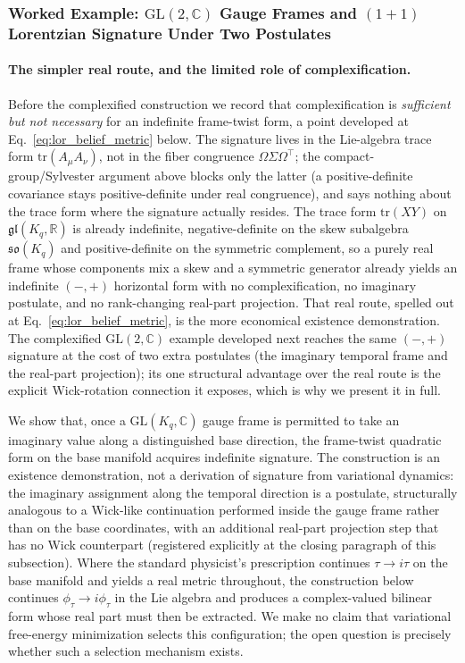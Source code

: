 \documentclass[11pt]{article}
\begin{document}
\subsubsection{Worked Example: $\mathrm{GL}(2, \mathbb{C})$ Gauge Frames and $(1{+}1)$ Lorentzian Signature Under Two Postulates}
\label{sec:worked_signature}

\paragraph{The simpler real route, and the limited role of complexification.} Before the complexified construction we record that complexification is \emph{sufficient but not necessary} for an indefinite frame-twist form, a point developed at Eq.~\eqref{eq:lor_belief_metric} below. The signature lives in the Lie-algebra trace form $\mathrm{tr}(A_\mu A_\nu)$, not in the fiber congruence $\Omega\Sigma\Omega^\top$; the compact-group/Sylvester argument above blocks only the latter (a positive-definite covariance stays positive-definite under real congruence), and says nothing about the trace form where the signature actually resides. The trace form $\mathrm{tr}(XY)$ on $\mathfrak{gl}(K_q, \mathbb{R})$ is already indefinite, negative-definite on the skew subalgebra $\mathfrak{so}(K_q)$ and positive-definite on the symmetric complement, so a purely real frame whose components mix a skew and a symmetric generator already yields an indefinite $(-,+)$ horizontal form with no complexification, no imaginary postulate, and no rank-changing real-part projection. That real route, spelled out at Eq.~\eqref{eq:lor_belief_metric}, is the more economical existence demonstration. The complexified $\mathrm{GL}(2,\mathbb{C})$ example developed next reaches the same $(-,+)$ signature at the cost of two extra postulates (the imaginary temporal frame and the real-part projection); its one structural advantage over the real route is the explicit Wick-rotation connection it exposes, which is why we present it in full.

We show that, once a $\mathrm{GL}(K_q, \mathbb{C})$ gauge frame is permitted to take an imaginary value along a distinguished base direction, the frame-twist quadratic form on the base manifold acquires indefinite signature. The construction is an existence demonstration, not a derivation of signature from variational dynamics: the imaginary assignment along the temporal direction is a postulate, structurally analogous to a Wick-like continuation performed inside the gauge frame rather than on the base coordinates, with an additional real-part projection step that has no Wick counterpart (registered explicitly at the closing paragraph of this subsection). Where the standard physicist's prescription continues $\tau \to i\tau$ on the base manifold and yields a real metric throughout, the construction below continues $\phi_\tau \to i\phi_\tau$ in the Lie algebra and produces a complex-valued bilinear form whose real part must then be extracted. We make no claim that variational free-energy minimization selects this configuration; the open question is precisely whether such a selection mechanism exists.
\end{document}
